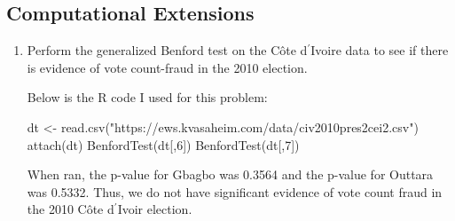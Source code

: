 \subsection*{Computational Extensions}
\begin{enumerate}

 \item Perform the generalized Benford test on the C\^{o}te d$^{\prime}$Ivoire data to see if there is evidence of vote count-fraud in the 2010 election.
\begin{solution}
Below is the R code I used for this problem:
\begin{codein}
dt <- read.csv("https://ews.kvasaheim.com/data/civ2010pres2cei2.csv")
attach(dt)
BenfordTest(dt[,6])
BenfordTest(dt[,7])
\end{codein}
When ran, the p-value for Gbagbo was 0.3564 and the p-value for Outtara was 0.5332. Thus, we do not have significant evidence of vote count fraud in the 2010 C\^{o}te d$^{\prime}$Ivoir election.
\end{solution}
\end{enumerate}
